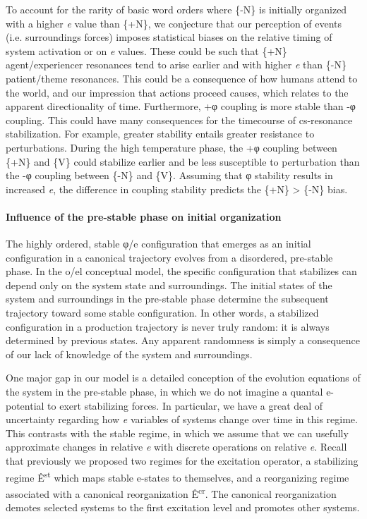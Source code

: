   To account for the rarity of basic word orders where \{-N\} is initially organized with a higher \textit{e} value than \{+N\}, we conjecture that our perception of events (i.e. surroundings forces) imposes statistical biases on the relative timing of system activation or on \textit{e} values. These could be such that \{+N\} agent/experiencer resonances tend to arise earlier and with higher \textit{e} than \{-N\} patient/theme resonances. This could be a consequence of how humans attend to the world, and our impression that actions proceed causes, which relates to the apparent directionality of time. Furthermore, +φ coupling is more stable than -φ coupling. This could have many consequences for the timecourse of cs-resonance stabilization. For example, greater stability entails greater resistance to perturbations. During the high temperature phase, the +φ coupling between \{+N\} and \{V\} could stabilize earlier and be less susceptible to perturbation than the -φ coupling between \{-N\} and \{V\}. Assuming that φ stability results in increased \textit{e}, the difference in coupling stability predicts the \{+N\} > \{-N\} bias.

\paragraph{Influence of the pre-stable phase on initial organization}

The highly ordered, stable φ/e configuration that emerges as an initial configuration in a canonical trajectory evolves from a disordered, pre-stable phase. In the o/el conceptual model, the specific configuration that stabilizes can depend only on the system state and surroundings. The initial states of the system and surroundings in the pre-stable phase determine the subsequent trajectory toward some stable configuration. In other words, a stabilized configuration in a production trajectory is never truly random: it is always determined by previous states. Any apparent randomness is simply a consequence of our lack of knowledge of the system and surroundings.

  One major gap in our model is a detailed conception of the evolution equations of the system in the pre-stable phase, in which we do not imagine a quantal e-potential to exert stabilizing forces. In particular, we have a great deal of uncertainty regarding how \textit{e} variables of systems change over time in this regime. This contrasts with the stable regime, in which we assume that we can usefully approximate changes in relative \textit{e} with discrete operations on relative \textit{e}. Recall that previously we proposed two regimes for the excitation operator, a stabilizing regime Ê\textsuperscript{st} which maps stable e-states to themselves, and a reorganizing regime associated with a canonical reorganization Ê\textsuperscript{cr}. The canonical reorganization demotes selected systems to the first excitation level and promotes other systems. 


